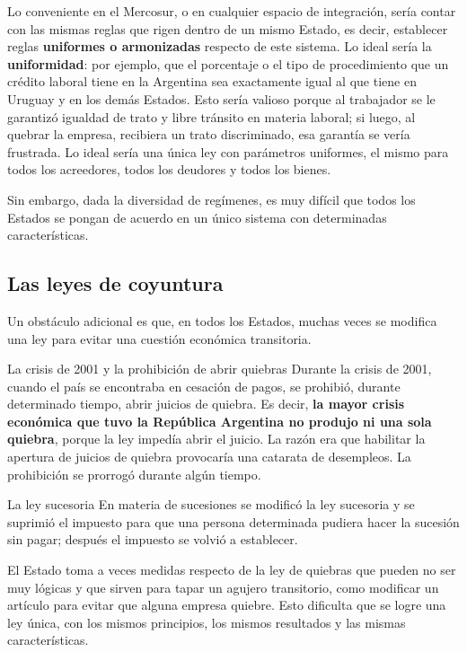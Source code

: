 \documentclass[12pt,oneside]{book}
\begin{document}
Lo conveniente en el Mercosur, o en cualquier espacio de integración, sería contar con las mismas reglas que rigen dentro de un mismo Estado, es decir, establecer reglas \textbf{uniformes o armonizadas} respecto de este sistema. Lo ideal sería la \textbf{uniformidad}: por ejemplo, que el porcentaje o el tipo de procedimiento que un crédito laboral tiene en la Argentina sea exactamente igual al que tiene en Uruguay y en los demás Estados. Esto sería valioso porque al trabajador se le garantizó igualdad de trato y libre tránsito en materia laboral; si luego, al quebrar la empresa, recibiera un trato discriminado, esa garantía se vería frustrada. Lo ideal sería una única ley con parámetros uniformes, el mismo para todos los acreedores, todos los deudores y todos los bienes.

Sin embargo, dada la diversidad de regímenes, es muy difícil que todos los Estados se pongan de acuerdo en un único sistema con determinadas características.

\subsection{Las leyes de coyuntura}

Un obstáculo adicional es que, en todos los Estados, muchas veces se modifica una ley para evitar una cuestión económica transitoria.

\begin{example}{La crisis de 2001 y la prohibición de abrir quiebras}
Durante la crisis de 2001, cuando el país se encontraba en cesación de pagos, se prohibió, durante determinado tiempo, abrir juicios de quiebra. Es decir, \textbf{la mayor crisis económica que tuvo la República Argentina no produjo ni una sola quiebra}, porque la ley impedía abrir el juicio. La razón era que habilitar la apertura de juicios de quiebra provocaría una catarata de desempleos. La prohibición se prorrogó durante algún tiempo.
\end{example}

\begin{example}{La ley sucesoria}
En materia de sucesiones se modificó la ley sucesoria y se suprimió el impuesto para que una persona determinada pudiera hacer la sucesión sin pagar; después el impuesto se volvió a establecer.
\end{example}

El Estado toma a veces medidas respecto de la ley de quiebras que pueden no ser muy lógicas y que sirven para tapar un agujero transitorio, como modificar un artículo para evitar que alguna empresa quiebre. Esto dificulta que se logre una ley única, con los mismos principios, los mismos resultados y las mismas características.
\end{document}

